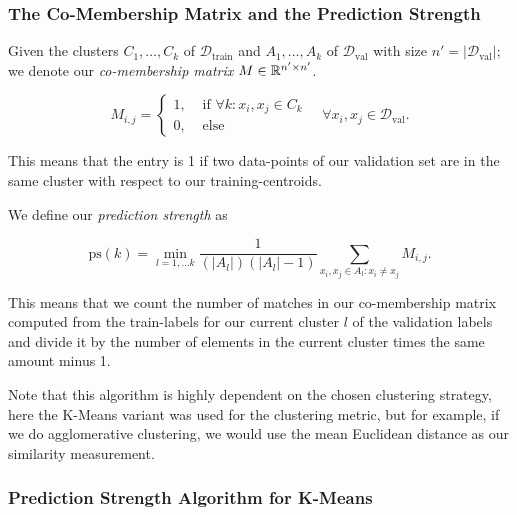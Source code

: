 \subsubsection{The Co-Membership Matrix and the Prediction Strength}

Given the clusters \(C_1, \dots, C_k\) of \(\mathcal{D}_{\text{train}}\) and \(A_1, \dots, A_k\) of
\(\mathcal{D}_{\text{val}}\) with size \(n' = |\mathcal{D}_{\text{val}}|\); we denote our \emph{co-membership matrix} \(M \in \mathbb{R}^{n' \times n'}\).

\[
	M_{i,j} =
	\begin{cases}
		1, & \text{ if } \forall k : x_i, x_j \in C_k \\
		0, & \text{ else}
	\end{cases}
	\quad
	\forall x_i, x_j \in \mathcal{D}_{\text{val}}.
\]

This means that the entry is 1 if two data-points of our validation set are in the same cluster with respect to our training-centroids.

We define our \emph{prediction strength} as

\[
	\mathrm{ps}(k) = \min_{l = 1, \dots k} \frac{1}{(|A_l|)( |A_l| - 1) } \sum_{x_i, x_j \in A_l: x_i \ne x_j} M_{i,j}.
\]

This means that we count the number of matches in our co-membership matrix computed from the train-labels for our current
cluster \(l\) of the validation labels and divide it by the number of elements in the current cluster times the same amount minus 1.

Note that this algorithm is highly dependent on the chosen clustering strategy, here the K-Means variant was used for the
clustering metric, but for example, if we do agglomerative clustering, we would use the mean Euclidean distance as our similarity measurement.

\subsubsection{Prediction Strength Algorithm for K-Means}

